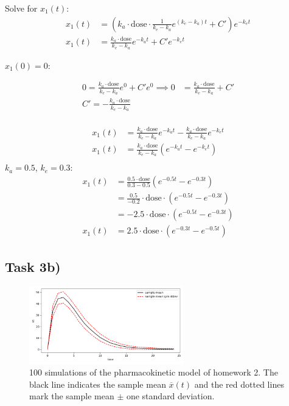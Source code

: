 \documentclass[]{scrartcl}
\begin{document}
Solve for $x_1(t)$:
\begin{align*}
x_1(t) &= \left( k_a \cdot \text{dose} \cdot \frac{1}{k_e - k_a} e^{(k_e - k_a)t} + C' \right) e^{-k_e t} \\
x_1(t) &= \frac{k_a \cdot \text{dose}}{k_e - k_a} e^{-k_a t} + C' e^{-k_e t}
\end{align*}

$x_1(0) = 0$:

\begin{align*}
0 = \frac{k_a \cdot \text{dose}}{k_e - k_a} e^0 + C' e^0 \implies 0 &= \frac{k_a \cdot \text{dose}}{k_e - k_a} + C'\\
C' = -\frac{k_a \cdot \text{dose}}{k_e - k_a}\\
\end{align*}

\begin{align*}
x_1(t) &= \frac{k_a \cdot \text{dose}}{k_e - k_a} e^{-k_a t} - \frac{k_a \cdot \text{dose}}{k_e - k_a} e^{-k_e t}\\
x_1(t) &= \frac{k_a \cdot \text{dose}}{k_e - k_a} (e^{-k_a t} - e^{-k_e t})\\
\end{align*}
$k_a=0.5$, $k_e=0.3$:
\begin{align*}
x_1(t) &= \frac{0.5 \cdot \text{dose}}{0.3 - 0.5} (e^{-0.5 t} - e^{-0.3 t}) \\
&= \frac{0.5}{-0.2} \cdot \text{dose} \cdot (e^{-0.5 t} - e^{-0.3 t}) \\
&= -2.5 \cdot \text{dose} \cdot (e^{-0.5 t} - e^{-0.3 t}) \\
x_1(t) &= 2.5 \cdot \text{dose} \cdot (e^{-0.3 t} - e^{-0.5 t})
\end{align*}


\clearpage
\subsection*{Task 3b)}

\begin{figure}[htbp!]
	\centering
	\includegraphics[width=0.6\textwidth]{Exercise3Homework3b.png}
	\caption{100 simulations of the pharmacokinetic model of homework 2.
			 The black line indicates the sample mean $\overline{x}(t)$ and the red dotted lines mark the sample mean $\pm$ one standard deviation.}
\end{figure}
\end{document}
